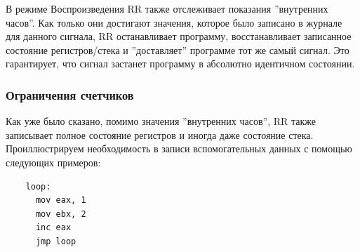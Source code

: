 В режиме Воспроизведения RR также отслеживает показания ''внутренних часов''.
Как только они достигают значения, которое было записано в журнале для данного
сигнала, RR останавливает программу, восстанавливает записанное состояние
регистров/стека и ''доставляет'' программе тот же самый сигнал. Это гарантирует,
что сигнал застанет программу в абсолютно идентичном состоянии.

\subsubsection{Ограничения счетчиков}




Как уже было сказано, помимо значения ''внутренних часов'', RR также записывает
полное состояние регистров и иногда даже состояние стека. Проиллюстрируем
необходимость в записи вспомогательных данных с помощью следующих примеров:

\begin{codelisting}[H]
  \begin{verbatim}
    loop:
      mov eax, 1
      mov ebx, 2
      inc eax
      jmp loop
  \end{verbatim}
  \caption{Пример ассемблерного кода с необходимостью записи регистров}
  \label{lst:good-loop}
\end{codelisting}

